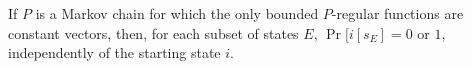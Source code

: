 If $P$ is a Markov chain for which the only bounded $P$-regular functions are constant vectors, then, for each subset of states $E$, $\Pr[i[s_E] = 0 \text{ or } 1$, independently of the starting state $i$.
